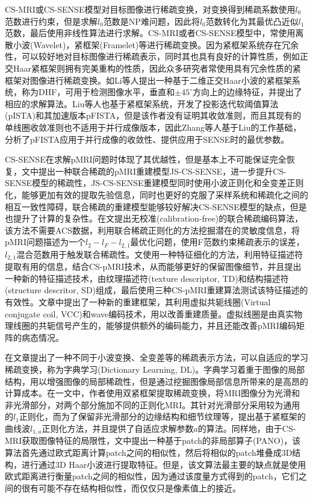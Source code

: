 \documentclass[UTF8]{article}
\begin{document}
\par CS-MRI或CS-SENSE模型对目标图像进行稀疏变换，对变换得到稀疏系数使用$l_0$范数进行约束，但是求解$l_0$范数是NP难问题，因此将$l_0$范数转化为其最优凸近似$l_1$范数，最后使用非线性算法进行求解。CS-MRI或者CS-SENSE模型中，常使用离散小波(Wavelet)，紧框架(Framelet)等进行稀疏变换。因为紧框架系统存在冗余性，可以较好地对目标图像进行稀疏表示，同时其也具有良好的计算性质，例如正交Haar紧框架则拥有完美重构的性质，因此众多研究者常使用具有冗余性质的紧框架对图像进行稀疏变换。如Li等人提出一种基于二维正交Haar小波的紧框架系统，称为DHF\cite{li2016adaptive}，可用于检测图像水平，垂直和$\pm 45^{\circ}$方向上的边缘特征，并提出了相应的求解算法。Liu等人也基于紧框架系统，开发了投影迭代软阈值算法(pISTA)\cite{7448403}和其加速版本pFISTA，但是该作者没有证明其收敛准则，而且其现有的单线圈收敛准则也不适用于并行成像版本，因此Zhang等人\cite{ZHANG2021101987}基于Liu的工作基础，分析了pFISTA应用于并行成像的收敛性、提供应用于SENSE时的最优参数。
\par CS-SENSE在求解pMRI问题时体现了其优越性，但是基本上不可能保证完全恢复，文\cite{chun2015efficient}中提出一种联合稀疏的pMRI重建模型JS-CS-SENSE，进一步提升CS-SENSE模型的稀疏性，JS-CS-SENSE重建模型同时使用小波正则化和全变差正则化，能够更加有效的提取先验信息，同时也更好的克服了采样系统和稀疏化之间的相互一致性障碍，联合稀疏的重建模型能够较好解决CS-SENSE模型的缺点，但是也提升了计算的复杂性。在文\cite{wang2017learning}提出无校准(calibration-free)的联合稀疏编码算法，该方法不需要ACS数据，利用联合稀疏正则化的方法挖掘潜在的灵敏度信息，将pMRI问题描述为一个$l_2-l_F-l_{2,1}$最优化问题，使用F范数约束稀疏表示的误差，$l_{2,1}$混合范数用于触发联合稀疏性。文\cite{cheng2018improved}使用一种特征细化的方法，利用特征描述符提取有用的信息，结合CS-pMRI技术，从而能够更好的保留图像细节，并且提出一种新的特征描述技术，由纹理描述符(texture descriptor, TD)和结构描述符(structure descritor, SD)组成，最后使用三种CS-pMRI重建算法测试该特征描述的有效性。文章\cite{qiu2021highly}中提出了一种新的重建框架，其利用虚拟共轭线圈(Virtual conjugate coil, VCC)\cite{blaimer2009virtual}和wave编码技术，用以改善重建质量。虚拟线圈是由真实物理线圈的共轭信号产生的，能够提供额外的编码能力，并且还能改善pMRI编码矩阵的病态情况。
\par 在文章\cite{ravishankar2010mr}提出了一种不同于小波变换、全变差等的稀疏表示方法，可以自适应的学习稀疏变换，称为字典学习(Dictionary Learning, DL)。字典学习着重于图像的局部结构，用以增强图像的局部稀疏性，但是通过挖掘图像局部信息所带来的是高昂的计算成本。在\cite{chen2020new}一文中，作者使用双紧框架提取稀疏变换，将MRI图像分为光滑和非光滑部分，对两个部分施加不同的正则化MRI。其针对光滑部分采用较为通用的$l_{1}$正则化，而为了保留非光滑部分的边缘结构和细节纹理等，提出基于紧框架的曲线波$l_{1,a}$正则化方法，并且提供了自适应求解参数$a$的算法。同样地，由于CS-MRI获取图像特征的局限性，文\cite{qu2014magnetic}中提出一种基于patch的非局部算子(PANO)，该算法首先通过欧式距离计算patch之间的相似性，然后将相似的patch堆叠成3D结构，进行通过3D Haar小波进行提取特征。但是，该文算法最主要的缺点就是使用欧式距离进行衡量patch之间的相似性，因为通过该度量方式得到的patch，它们之间的很有可能不存在结构相似性，而仅仅只是像素值上的接近。
\end{document}
